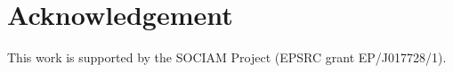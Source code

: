 \documentclass{chi-ext}
\begin{document}


\section{Acknowledgement}

This work is supported by the SOCIAM Project (EPSRC grant EP/J017728/1).



%
%
\end{document}

